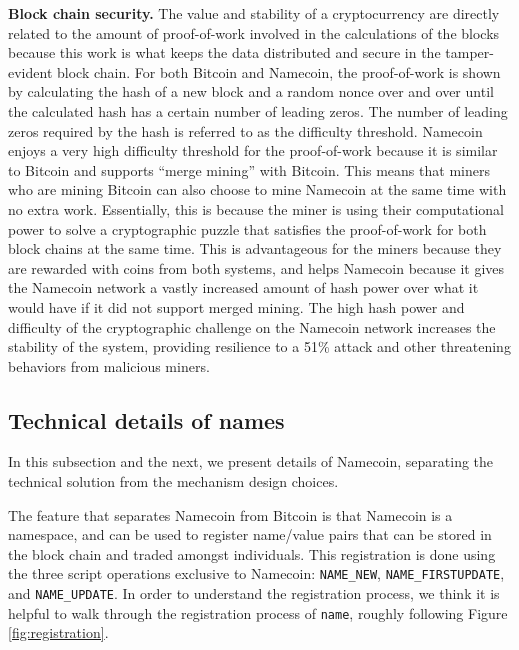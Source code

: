 {\bf Block chain security.}
The value and stability of a cryptocurrency are directly related to the amount of proof-of-work involved in the calculations of the blocks because this work is what keeps the data distributed and secure in the tamper-evident block chain. For both Bitcoin and Namecoin, the proof-of-work is shown by calculating the hash of a new block and a random nonce over and over until the calculated hash has a certain number of leading zeros. The number of leading zeros required by the hash is referred to as the difficulty threshold. Namecoin enjoys a very high difficulty threshold for the proof-of-work because it is similar to Bitcoin and supports ``merge mining'' with Bitcoin. This means that miners who are mining Bitcoin can also choose to mine Namecoin at the same time with no extra work. Essentially, this is because the miner is using their computational power to solve a cryptographic puzzle that satisfies the proof-of-work for both block chains at the same time. This is advantageous for the miners because they are rewarded with coins from both systems, and helps Namecoin because it gives the Namecoin network a vastly increased amount of hash power over what it would have if it did not support merged mining. The high hash power and difficulty of the cryptographic challenge on the Namecoin network increases the stability of the system, providing resilience to a 51\% attack and other threatening behaviors from malicious miners.

\subsection{Technical details of names}
\label{subsec:technical_details_of_names}

In this subsection and the next, we present details of Namecoin, separating the technical solution from the mechanism design choices. 

The feature that separates Namecoin from Bitcoin is that Namecoin is a namespace, and can be used to register name/value pairs that can be stored in the block chain and traded amongst individuals. This registration is done using the three script operations exclusive to Namecoin: {\tt NAME\_NEW}, {\tt NAME\_FIRSTUPDATE}, and {\tt NAME\_UPDATE}. In order to understand the registration process, we think it is helpful to walk through the registration process of {\tt name}, roughly following Figure \ref{fig:registration}. 


